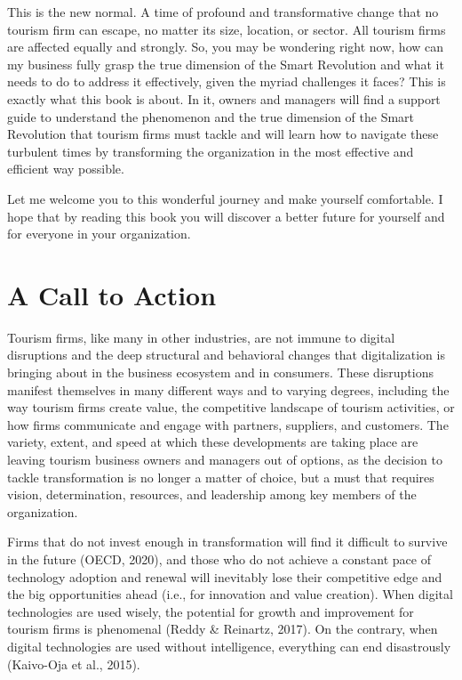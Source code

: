 \documentclass[
  letterpaper,
  DIV=11,
  numbers=noendperiod]{scrreprt}
\begin{document}
This is the new normal. A time of profound and transformative change
that no tourism firm can escape, no matter its size, location, or
sector. All tourism firms are affected equally and strongly. So, you may
be wondering right now, how can my business fully grasp the true
dimension of the Smart Revolution and what it needs to do to address it
effectively, given the myriad challenges it faces? This is exactly what
this book is about. In it, owners and managers will find a support guide
to understand the phenomenon and the true dimension of the Smart
Revolution that tourism firms must tackle and will learn how to navigate
these turbulent times by transforming the organization in the most
effective and efficient way possible.

Let me welcome you to this wonderful journey and make yourself
comfortable. I hope that by reading this book you will discover a better
future for yourself and for everyone in your organization.

\hypertarget{a-call-to-action}{%
\chapter{A Call to Action}\label{a-call-to-action}}

Tourism firms, like many in other industries, are not immune to digital
disruptions and the deep structural and behavioral changes that
digitalization is bringing about in the business ecosystem and in
consumers. These disruptions manifest themselves in many different ways
and to varying degrees, including the way tourism firms create value,
the competitive landscape of tourism activities, or how firms
communicate and engage with partners, suppliers, and customers. The
variety, extent, and speed at which these developments are taking place
are leaving tourism business owners and managers out of options, as the
decision to tackle transformation is no longer a matter of choice, but a
must that requires vision, determination, resources, and leadership
among key members of the organization.

Firms that do not invest enough in transformation will find it difficult
to survive in the future (OECD, 2020), and those who do not achieve a
constant pace of technology adoption and renewal will inevitably lose
their competitive edge and the big opportunities ahead (i.e., for
innovation and value creation). When digital technologies are used
wisely, the potential for growth and improvement for tourism firms is
phenomenal (Reddy \& Reinartz, 2017). On the contrary, when digital
technologies are used without intelligence, everything can end
disastrously (Kaivo-Oja et al., 2015).
\end{document}
